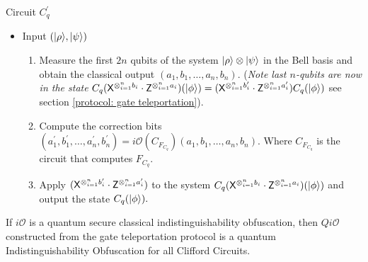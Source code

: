 \begin{algorithm}[H]
\caption{Circuit $C_q^\prime$}
  \begin{itemize}
  \item Input  $\left({\lvert}\rho\rangle, {\lvert}\psi\rangle \right)$
  \begin{enumerate}
  \item  Measure the first $2n$ qubits of the system ${\lvert}\rho\rangle\otimes {\lvert}\psi\rangle$ in the Bell basis and obtain the classical output $(a_1,b_1,\ldots,a_n,b_n).$ ({\em Note last $n$-qubits are now in the state} $C_q({\sf X}^{\otimes_{i=1}^{n} b_{i}} \cdot {\sf Z}^{\otimes_{i=1}^{n} a_{i}})({\lvert}\phi\rangle)=({\sf X}^{\otimes_{i=1}^{n} b_{i}^\prime} \cdot {\sf Z}^{\otimes_{i=1}^{n} a_{i}^\prime})C_q({\lvert}\phi\rangle)$ see section \ref{protocol: gate  teleportation}).
  \item Compute the correction bits $(a_1^\prime,b_1^\prime,\ldots,a_n^\prime,b_n^\prime)=i\mathcal{O}(C_{F_{C_q}})(a_1,b_1,\ldots,a_n,b_n).$ Where $C_{F_{C_q}}$ is the circuit that computes $F_{C_q}.$
  \item Apply $({\sf X}^{\otimes_{i=1}^{n} b_{i}^\prime} \cdot {\sf Z}^{\otimes_{i=1}^{n} a_{i}^\prime})$ to the system $C_q({\sf X}^{\otimes_{i=1}^{n} b_{i}} \cdot {\sf Z}^{\otimes_{i=1}^{n} a_{i}})({\lvert}\phi\rangle)$  and output the state $C_q({\lvert}\phi\rangle).$
  \end{enumerate}
  \end{itemize}
\end{algorithm}

\begin{theorem}
If $i\mathcal{O}$ is a quantum secure classical indistinguishability obfuscation, then $Qi\mathcal{O}$ constructed from the gate teleportation protocol is a quantum Indistinguishability Obfuscation for all Clifford Circuits.
\end{theorem}

